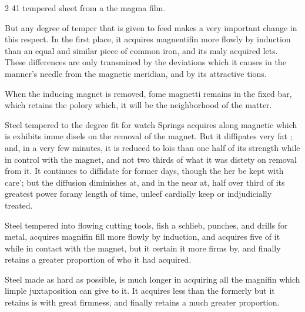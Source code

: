 \documentclass[10pt]{article}
\begin{document}
\begin{multicols}{2}\raggedcolumns
41 tempered sheet from a the magma film.

But any degree of temper that is given to feed makes a very important change in this respect. In the first place, it acquires magnentifin more flowly by induction than an equal and similar piece of common iron, and its maly acquired lets. These differences are only transmined by the deviations which it causes in the manner’s needle from the magnetic meridian, and by its attractive tions.

When the inducing magnet is removed, fome magnetti remains in the fixed bar, which retains the polory which, it will be the neighborhood of the matter.

Steel tempered to the degree fit for watch Springs acquires along magnetic which is exhibits imme disels on the removal of the magnet. But it diffipates very fat ; and, in a very few minutes, it is reduced to lois than one half of its strength while in control with the magnet, and not two thirds of what it was distety on removal from it. It continues to diffidate for former days, though the her be kept with care'; but the diffusion diminishes at, and in the near at, half over third of its greatest power forany length of time, unleef cardially keep or indjudicially treated.

Steel tempered into flowing cutting tools, fish a schlieb, punches, and drills for metal, acquires magnifin fill more flowly by induction, and acquires five of it while in contact with the magnet, but it certain it more firms by, and finally retains a greater proportion of who it had acquired.

Steel made as hard as possible, is much longer in acquiring all the magnifin which limple juxtaposition can give to it. It acquires less than the formerly but it retains is with great firmness, and finally retains a much greater proportion.


\end{multicols}
\end{document}
